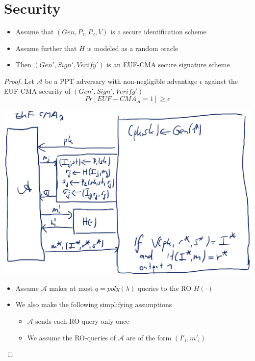 \section{Security}
    \begin{theorem}\label{thm9.3}
        \begin{itemize}
            \item Assume that $(Gen,P_1,P_2,V)$ is a secure identification scheme
            \item Assume further that $H$ is modeled as a random oracle
            \item Then $(Gen',Sign',Verify')$ is an EUF-CMA secure signature scheme
        \end{itemize}
    \end{theorem}
    \begin{proof}
        Let $\mathcal{A}$ be a PPT adversary with non-negligible advantage $\epsilon$ against the EUF-CMA security of $(Gen',Sign',Verify')$
        $$Pr[EUF-CMA_{\mathcal{A}}=1] \geq \epsilon$$
        \begin{center}
            \includegraphics[width=160mm]{Graphics/Digital Signatures/fst2.png}
        \end{center}
        \begin{itemize}
            \item Assume $\mathcal{A}$ makes at most $q=poly(\lambda)$ queries to the RO $H(\cdot)$
            \item We also make the following simplifying assumptions
            \begin{itemize}
                \item $\mathcal{A}$ sends each RO-query only once
                \item We assume the RO-queries of $\mathcal{A}$ are of the form $(I'_i,m'_i)$

\end{itemize}
\end{itemize}
\end{proof}
